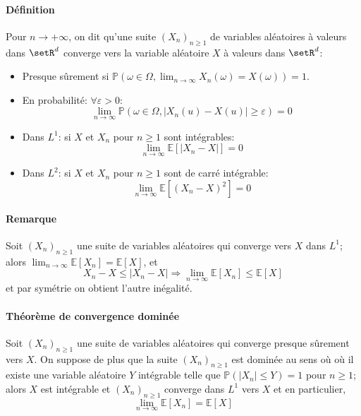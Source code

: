 \documentclass[a4paper,10pt,french,openany]{memoir}
\newcommand{\Proba}{\mathbb{P}}
\newcommand{\Esper}{\mathbb{E}}
\newcommand{\implique}{\Rightarrow}
\newcommand{\abs}[1]{\lvert #1 \rvert}
\begin{document}
\paragraph{Définition}
Pour $n\to+\infty$, on dit qu'une suite $(X_n)_{n\geq1}$ de variables aléatoires à valeurs dans $\setR^d$ converge vers la variable aléatoire $X$ à valeurs dans $\setR^d$:
\begin{itemize}
 \item Presque sûrement si $\Proba(\omega\in\Omega, \lim_{n\to\infty} X_n(\omega) = X(\omega)) = 1$.
 
 \item En probabilité: $\forall \varepsilon > 0$:
 \[\lim_{n\to\infty} \Proba(\omega\in\Omega, \abs{X_n(u) - X(u)} \geq \varepsilon) = 0\]
 
 \item Dans $L^1$: si $X$ et $X_n$ pour $n\geq1$ sont intégrables:
 \[ \lim_{n\to\infty} \Esper[\abs{X_n - X}] = 0 \]
 
 \item Dans $L^2$: si $X$ et $X_n$ pour $n\geq 1$ sont de carré intégrable:
 \[ \lim_{n\to\infty} \Esper\left[(X_n-X)^2\right] = 0\]
\end{itemize}

\paragraph{Remarque}
Soit $(X_n)_{n\geq1}$ une suite de variables aléatoires qui converge vers $X$ dans $L^1$; alors $\lim_{n\to\infty} \Esper[X_n]=\Esper[X]$, et \[X_n-X\leq\abs{X_n-X} \implique \lim_{n\to\infty} \Esper[X_n]\leq\Esper[X]\] et par symétrie on obtient l'autre inégalité.

\paragraph{Théorème de convergence dominée}
Soit $(X_n)_{n\geq1}$ une suite de variables aléatoires qui converge presque sûrement vers $X$. On suppose de plus que la suite $(X_n)_{n\geq1}$ est dominée au sens où où il existe une variable aléatoire $Y$ intégrable telle que $\Proba(\abs{X_n}\leq Y) = 1$ pour $n\geq1$; alors $X$ est intégrable et $(X_n)_{n\geq1}$ converge dans $L^1$ vers $X$ et en particulier, \[\lim_{n\to\infty} \Esper[X_n]=\Esper[X]\]
\end{document}
